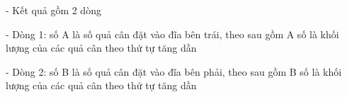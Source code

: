 - Kết quả gồm 2 dòng  

   - Dòng 1: số A là số quả cân đặt vào đĩa bên trái, theo sau gồm A số là khối lượng của các quả cân theo thứ tự tăng dần  

   - Dòng 2: số B là số quả cân đặt vào đĩa bên phải, theo sau gồm B số là khối lượng của các quả cân theo thứ tự tăng dần  

\